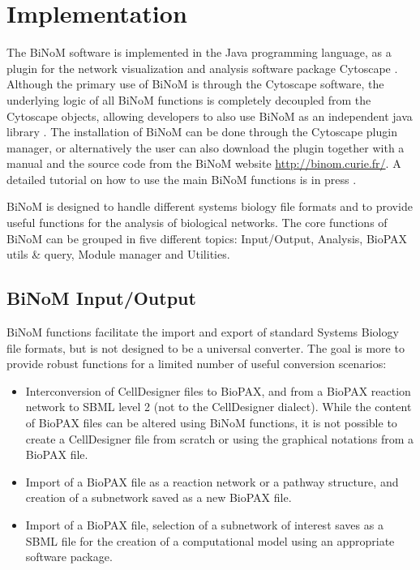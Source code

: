 \documentclass[10pt]{bmc_article}
\newenvironment{bmcformat}{\baselineskip20pt\sloppy\setboolean{publ}{false}}{\baselineskip20pt\sloppy}
\begin{document}
\begin{bmcformat}
\section*{Implementation}
The BiNoM software is implemented in the Java programming language, as a plugin
for the network visualization and analysis software package Cytoscape
\cite{cline2007integration}. Although the primary use of BiNoM is through the
Cytoscape software, the underlying logic of all BiNoM functions is completely
decoupled from the Cytoscape objects, allowing developers to also use BiNoM as
an independent java library \cite{zinovyev2008binom}. The installation of BiNoM
can be done through the Cytoscape plugin manager, or alternatively the user can
also download the plugin together with a manual and the source code from the
BiNoM website
\url{http://binom.curie.fr/}. A detailed tutorial on how to use the main BiNoM
functions is in press
\cite{binomBookChapter}.


BiNoM is designed to handle different systems biology file formats and to
provide useful functions for the analysis of biological networks. The core
functions of BiNoM can be grouped in five different topics: Input/Output,
Analysis, BioPAX utils \& query, Module manager and Utilities.


\subsection*{BiNoM Input/Output}

BiNoM functions facilitate the import and export of standard Systems Biology
file formats, but is not designed to be a universal converter. The goal is more
to provide robust functions for a limited number of useful conversion
scenarios: 

\begin{itemize}

\item Interconversion of CellDesigner files to BioPAX, and from a BioPAX
reaction network to SBML level 2 (not to the CellDesigner dialect). While the
content of BioPAX files can be altered using BiNoM functions, it is not possible
to create a CellDesigner file from scratch or using the graphical notations from
a BioPAX file. 

\item Import of a BioPAX file as a
reaction network or a pathway structure, and creation of a subnetwork saved as a new BioPAX file. 

\item Import of a BioPAX file, selection of a subnetwork of interest saves as a SBML file for
the creation of a computational model using an appropriate software package.


\end{itemize}
\end{bmcformat}
\end{document}
